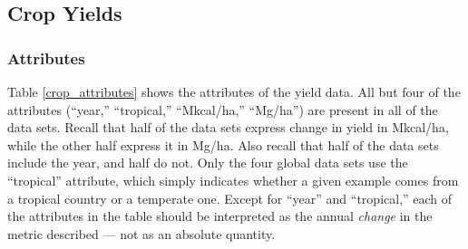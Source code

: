 \documentclass[12pt]{article}
\begin{document}
\clearpage
\subsection{Crop Yields}
\subsubsection{Attributes}
Table \ref{crop_attributes} shows the attributes of the yield data. All but four of the attributes (``year,'' ``tropical,'' ``Mkcal/ha,'' ``Mg/ha'') are present in all of the data sets. Recall that half of the data sets express change in yield in Mkcal/ha, while the other half express it in Mg/ha. Also recall that half of the data sets include the year, and half do not. Only the four global data sets use the ``tropical'' attribute, which simply indicates whether a given example comes from a tropical country or a temperate one. Except for ``year'' and ``tropical,'' each of the attributes in the table should be interpreted as the annual \emph{change} in the metric described --- not as an absolute quantity. 
\end{document}
